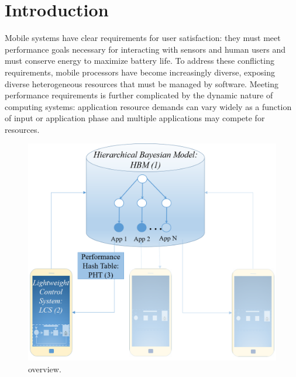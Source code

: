 \section{Introduction}
Mobile systems have clear requirements for user satisfaction: they
must meet performance goals necessary for interacting with sensors and
human users and must conserve energy to maximize battery life.  To
address these conflicting requirements, mobile processors have become
increasingly diverse, exposing diverse heterogeneous resources that
must be managed by software. Meeting performance requirements is
further complicated by the dynamic nature of computing systems:
application resource demands can vary widely as a function of input or
application phase and multiple applications may compete for resources.

\begin{figure}
\includegraphics[width=\columnwidth]{figures/Mobile2.png}
\caption{\SYSTEM{} overview.}
  \label{fig:overview}
\end{figure}


